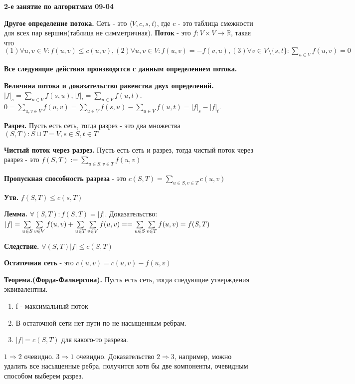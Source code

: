 \begin{center}
 \textbf{2-е занятие по алгоритмам 09-04}
\end{center}

  \textbf{Другое определение потока.} Сеть - это $\langle V, c, s, t \rangle$, где c - это таблица смежности для всех пар вершин(таблица не симметричная).  \textbf{Поток} - это $f : V \times V \to \mathbb{R} $, такая что\break $(1) \forall u, v \in V: f(u, v) \leqslant c(u, v), (2) \forall u, v \in V: f(u, v) = - f(v, u), (3) \forall v \in V \setminus \{s, t\}: \sum\limits_{u\in V}^{}f(u, v)=0 $

  \textbf{Все следующие действия производятся с данным определением потока.} 

  \textbf{Величина потока и доказательство равенства двух определений.} $|f|_s = \sum\limits_{u\in V}^{} f(s, u), |f|_t=\sum\limits_{u\in V}^{} f(u, t)$. $0 = \sum\limits_{u, v \in V}^{} f(u, v) = \sum\limits_{u\in V}^{} f(s, u) - \sum\limits_{u\in V}^{} f(u, t) = |f|_s - |f|_t$.

  \textbf{Разрез.} Пусть есть сеть, тогда разрез - это два множества $(S, T): S \sqcup T = V, s \in S, t \in T$

   \textbf{Чистый поток через разрез.} Пусть есть сеть и разрез, тогда чистый поток через разрез - это $f(S, T) := \sum\limits_{u\in S, v\in T}^{}f(u, v) $

   \textbf{Пропускная способность разреза} - это $c(S, T) = \sum\limits_{u\in S, v \in T}^{} c(u, v)$

   \textbf{Утв.} $f(S, T) \leqslant c(s, T)$

   \textbf{Лемма.}  $\forall (S, T): f(S, T) = |f|$. Доказательство: $|f| = \sum\limits_{u\in S}^{} \sum\limits_{v \in V}^{} f(u, v) + \sum\limits_{u \in T}^{} \sum\limits_{v\in V}^{} f(u, v) =\break= \sum\limits_{u\in S}^{} \sum\limits_{v \in T}^{} f(u, v) = f(S, T)$

   \textbf{Следствие.} $\forall (S, T) |f| \leqslant c(S, T)$

    \textbf{Остаточная сеть} - это $c(u, v) = c(u, v) - f(u, v)$

     \textbf{Теорема.(Форда-Фалкерсона).} Пусть есть сеть, тогда следующие утверждения эквивалентны.
  \begin{enumerate}
    \item f - максимальный поток
    \item В остаточной сети нет пути по не насыщенным ребрам.
    \item $|f|=c(S, T)$ для какого-то разреза.
  \end{enumerate}
  $1\Rightarrow 2$ очевидно. $3 \Rightarrow 1$ очевидно. Доказательство $2 \Rightarrow 3$, например, можно удалить все насыщенные ребра, получится хотя бы две компоненты, очевидным способом выберем разрез.

